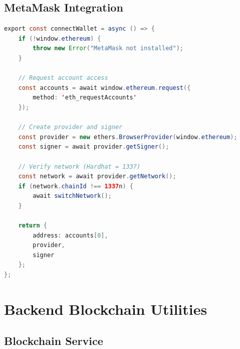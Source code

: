 \subsection{MetaMask Integration}

\begin{lstlisting}[language=Java, caption=Wallet Connection]
export const connectWallet = async () => {
    if (!window.ethereum) {
        throw new Error("MetaMask not installed");
    }
    
    // Request account access
    const accounts = await window.ethereum.request({
        method: 'eth_requestAccounts'
    });
    
    // Create provider and signer
    const provider = new ethers.BrowserProvider(window.ethereum);
    const signer = await provider.getSigner();
    
    // Verify network (Hardhat = 1337)
    const network = await provider.getNetwork();
    if (network.chainId !== 1337n) {
        await switchNetwork();
    }
    
    return {
        address: accounts[0],
        provider,
        signer
    };
};
\end{lstlisting}

\section{Backend Blockchain Utilities}

\subsection{Blockchain Service}

